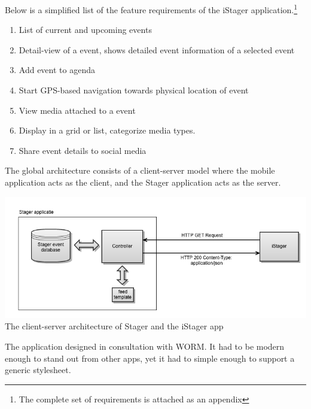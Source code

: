 \noindent Below is a simplified list of the feature requirements of the iStager application.\footnote{The complete set of requirements is attached as an appendix} %
\begin{enumerate}
\item
List of current and upcoming events
\item
Detail-view of a event, shows detailed event information of a selected event
\item
Add event to agenda
\item
Start GPS-based navigation towards physical location of event
\item
View media attached to a event
\item
Display in a grid or list, categorize media types.
\item
Share event details to social media
\end{enumerate}

The global architecture consists of a client-server model where the mobile application acts as the client, and the Stager application acts as the server.

\begin{centering}
	\includegraphics[scale=0.4]{images/globale_architectuur.png}\\{The client-server architecture of Stager and the iStager app}\\
\end{centering}

The application designed in consultation with WORM. It had to be modern enough to stand out from other apps, yet it had to simple enough to support a generic stylesheet.


